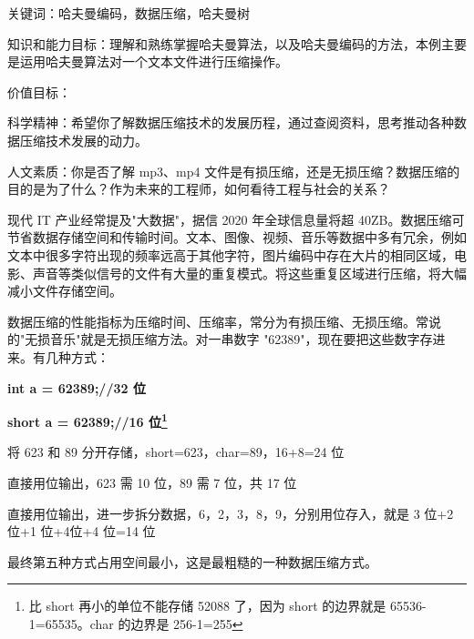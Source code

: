 \clearpage
{}
\noindent\hspace*{2em}关键词：哈夫曼编码，数据压缩，哈夫曼树\par
\noindent\hspace*{2em}知识和能力目标：理解和熟练掌握哈夫曼算法，以及哈夫曼编码的方法，本例主要是运用哈夫曼算法对一个文本文件进行压缩操作。\par
\noindent\hspace*{2em}价值目标：\par
\noindent\hspace*{2em}科学精神：希望你了解数据压缩技术的发展历程，通过查阅资料，思考推动各种数据压缩技术发展的动力。\par
\noindent\hspace*{2em}人文素质：你是否了解 mp3、mp4 文件是有损压缩，还是无损压缩？数据压缩的目的是为了什么？作为未来的工程师，如何看待工程与社会的关系？\par
{}
\noindent\hspace*{2em}现代 IT 产业经常提及"大数据"，据信 2020 年全球信息量将超 40ZB。数据压缩可节省数据存储空间和传输时间。文本、图像、视频、音乐等数据中多有冗余，例如文本中很多字符出现的频率远高于其他字符，图片编码中存在大片的相同区域，电影、声音等类似信号的文件有大量的重复模式。将这些重复区域进行压缩，将大幅减小文件存储空间。\par
\noindent\hspace*{2em}数据压缩的性能指标为压缩时间、压缩率，常分为有损压缩、无损压缩。常说的"无损音乐"就是无损压缩方法。对一串数字 "62389"，现在要把这些数字存进来。有几种方式：\par
\noindent\textbf{int a = 62389;\quad //32 位}\par
\noindent\textbf{short a = 62389;\quad //16 位\footnote{比 short 再小的单位不能存储 52088 了，因为 short 的边界就是 65536-1=65535。char 的边界是 256-1=255}}\par
\noindent\hspace*{2em}将 623 和 89 分开存储，short=623，char=89，16+8=24 位\par
\noindent\hspace*{2em}直接用位输出，623 需 10 位，89 需 7 位，共 17 位\par
\noindent\hspace*{2em}直接用位输出，进一步拆分数据，6，2，3，8，9，分别用位存入，就是 3 位+2 位+1 位+4位+4 位=14 位\par
\noindent\hspace*{2em}最终第五种方式占用空间最小，这是最粗糙的一种数据压缩方式。\par
